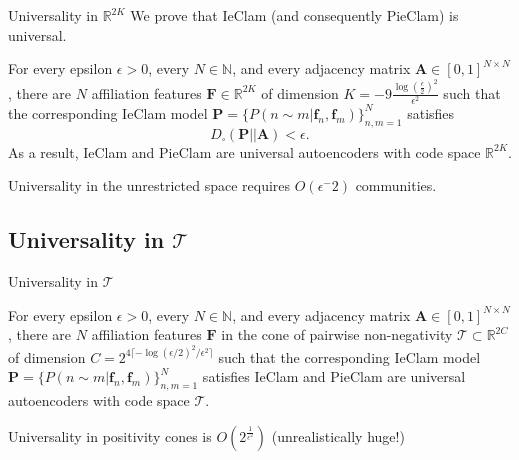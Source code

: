 \documentclass{beamer}
\begin{document}
\begin{frame}{Universality in $\mathbb{R}^{2K}$}
    We prove that IeClam (and consequently PieClam) is universal.
\begin{theorem}
\label{thm:IEUniversality}
    For every epsilon $\epsilon>0$, every $N\in\mathbb{N}$, and every adjacency matrix $\mathbf{A}\in[0,1]^{N\times N}$, there are $N$ affiliation features $\mathbf{F}\in \mathbb{R}^{2K}$ of dimension  $K=-9\frac{\log(\frac{\epsilon}{2})^2}{\epsilon^2}$ such that the corresponding IeClam model $\mathbf{P}=\{P(n\sim m|\mathbf{f}_n, \mathbf{f}_m)\}_{n,m=1}^N$ satisfies 
     \[D_{\square}(\mathbf{P} || \mathbf{A}) <\epsilon.\] 
    As a result, 
    IeClam and PieClam are universal autoencoders with code space $\mathbb{R}^{2K}$.
\end{theorem}

Universality in the unrestricted space requires $O(\epsilon^-2)$ communities.
\end{frame}


\subsection{Universality in  $\mathcal{T}$}
\begin{frame}{Universality in $\mathcal{T}$}
    
\begin{theorem}
    For every epsilon $\epsilon>0$, every $N\in\mathbb{N}$, and every adjacency matrix $\mathbf{A}\in[0,1]^{N\times N}$, there are $N$ affiliation features $\mathbf{F}$ in the cone of pairwise non-negativity  $\mathcal{T}\subset \mathbb{R}^{2C}$ of dimension  $C=2^{4\lceil -\log(\epsilon/2)^2/\epsilon^2\rceil}$  such that the corresponding IeClam model $\mathbf{P}=\{P(n\sim m|\mathbf{f}_n, \mathbf{f}_m)\}_{n,m=1}^N$ satisfies 
    IeClam and PieClam are universal autoencoders with code space $\mathcal{T}$.
\end{theorem}
Universality in positivity cones is $O(2^{\frac{1}{\epsilon^2}})$ (unrealistically huge!)
\end{frame}
\end{document}
